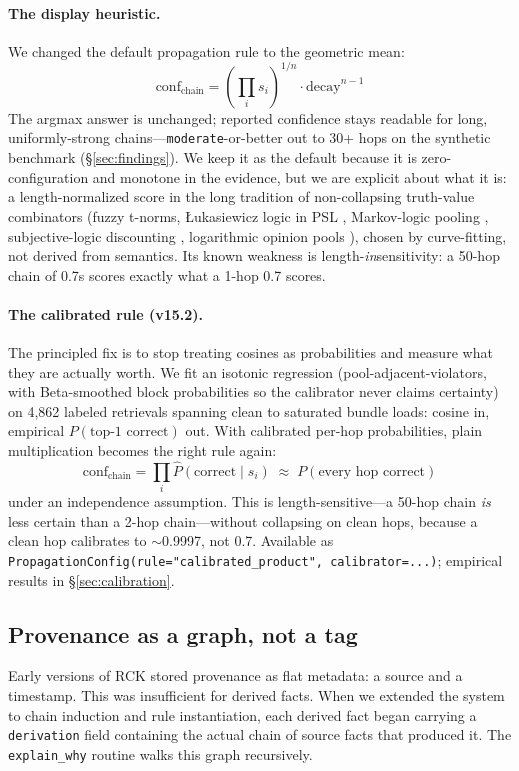 \documentclass[11pt]{article}
\begin{document}
\paragraph{The display heuristic.} We changed the default
propagation rule to the geometric mean:
\[
\text{conf}_{\text{chain}} = \left( \prod_i s_i \right)^{1/n} \cdot \text{decay}^{n-1}
\]
The argmax answer is unchanged; reported confidence stays readable
for long, uniformly-strong chains---\texttt{moderate}-or-better out
to 30+ hops on the synthetic benchmark (\S\ref{sec:findings}). We
keep it as the default because it is zero-configuration and monotone
in the evidence, but we are explicit about what it is: a
length-normalized score in the long tradition of non-collapsing
truth-value combinators (fuzzy t-norms, {\L}ukasiewicz logic in PSL
\cite{bach2017psl}, Markov-logic pooling \cite{richardson2006mln},
subjective-logic discounting \cite{josang2016}, logarithmic opinion
pools \cite{genest1986}), chosen by curve-fitting, not derived from
semantics. Its known weakness is length-\emph{in}sensitivity: a
50-hop chain of 0.7s scores exactly what a 1-hop 0.7 scores.

\paragraph{The calibrated rule (v15.2).} The principled fix is to
stop treating cosines as probabilities and measure what they are
actually worth. We fit an isotonic regression
(pool-adjacent-violators, with Beta-smoothed block probabilities so
the calibrator never claims certainty) on 4{,}862 labeled retrievals
spanning clean to saturated bundle loads: cosine in, empirical
$P(\text{top-1 correct})$ out. With calibrated per-hop
probabilities, plain multiplication becomes the right rule again:
\[
\text{conf}_{\text{chain}} = \prod_i \hat{P}(\text{correct} \mid s_i)
\;\approx\; P(\text{every hop correct})
\]
under an independence assumption. This is length-sensitive---a
50-hop chain \emph{is} less certain than a 2-hop chain---without
collapsing on clean hops, because a clean hop calibrates to
$\sim$0.9997, not 0.7. Available as
\texttt{PropagationConfig(rule="calibrated\_product",
calibrator=...)}; empirical results in \S\ref{sec:calibration}.

\subsection{Provenance as a graph, not a tag}

Early versions of RCK stored provenance as flat metadata: a source
and a timestamp. This was insufficient for derived facts. When we
extended the system to chain induction and rule instantiation, each
derived fact began carrying a \texttt{derivation} field containing
the actual chain of source facts that produced it. The
\texttt{explain\_why} routine walks this graph recursively.
\end{document}
